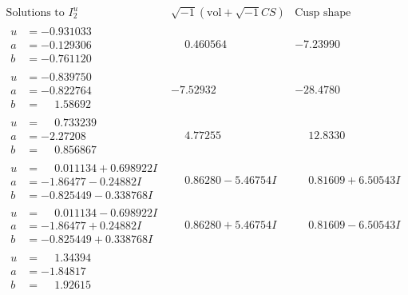 \documentclass[1p]{elsarticle_modified}
\theoremstyle{definition}
\newcommand{\I}{\sqrt{-1}}
\begin{document}
$$\begin{array}{c|c|c}  
\text{Solutions to }I^u_{2}& \I (\text{vol} + \sqrt{-1}CS) & \text{Cusp shape}\\
 \hline 
\begin{aligned}
u &= -0.931033\phantom{ +0.000000I} \\
a &= -0.129306\phantom{ +0.000000I} \\
b &= -0.761120\phantom{ +0.000000I}\end{aligned}
 & \phantom{-}0.460564\phantom{ +0.000000I} & -7.23990\phantom{ +0.000000I} \\ \hline\begin{aligned}
u &= -0.839750\phantom{ +0.000000I} \\
a &= -0.822764\phantom{ +0.000000I} \\
b &= \phantom{-}1.58692\phantom{ +0.000000I}\end{aligned}
 & -7.52932\phantom{ +0.000000I} & -28.4780\phantom{ +0.000000I} \\ \hline\begin{aligned}
u &= \phantom{-}0.733239\phantom{ +0.000000I} \\
a &= -2.27208\phantom{ +0.000000I} \\
b &= \phantom{-}0.856867\phantom{ +0.000000I}\end{aligned}
 & \phantom{-}4.77255\phantom{ +0.000000I} & \phantom{-}12.8330\phantom{ +0.000000I} \\ \hline\begin{aligned}
u &= \phantom{-}0.011134 + 0.698922 I \\
a &= -1.86477 - 0.24882 I \\
b &= -0.825449 - 0.338768 I\end{aligned}
 & \phantom{-}0.86280 - 5.46754 I & \phantom{-}0.81609 + 6.50543 I \\ \hline\begin{aligned}
u &= \phantom{-}0.011134 - 0.698922 I \\
a &= -1.86477 + 0.24882 I \\
b &= -0.825449 + 0.338768 I\end{aligned}
 & \phantom{-}0.86280 + 5.46754 I & \phantom{-}0.81609 - 6.50543 I \\ \hline\begin{aligned}
u &= \phantom{-}1.34394\phantom{ +0.000000I} \\
a &= -1.84817\phantom{ +0.000000I} \\
b &= \phantom{-}1.92615\phantom{ +0.000000I}\end{aligned}

\end{array}$$
\end{document}

